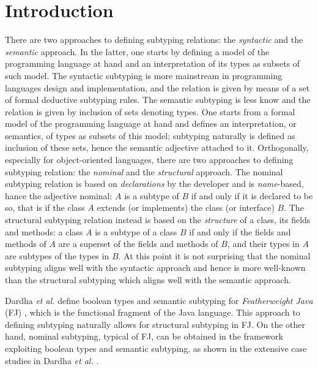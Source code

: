 \documentclass[runningheads]{llncs}
\begin{document}
\section{Introduction}
There are two approaches to defining subtyping relations: the \emph{syntactic} and the \emph{semantic} approach.
In the latter, one starts by defining a model of the programming language at hand and an interpretation of its types as subsets of such model.
The syntactic subtyping is more mainstream in programming languages design and implementation, and the relation is given by means of a set of formal deductive subtyping rules.
The semantic subtyping is less know and the relation is given by inclusion of sets denoting types. One starts from a formal model of the programming language at hand and defines an interpretation, or semantics, of types as subsets of this model; subtyping naturally is defined as inclusion of these sets, hence the semantic adjective attached to it.
Orthogonally, especially for object-oriented languages, there are two approaches to defining subtyping relation: the \emph{nominal} and the \emph{structural} approach.
The nominal subtyping relation is based on \emph{declarations} by the developer and is \emph{name}-based, hance the adjective nominal: $A$ is a subtype of $B$ if and only if it is declared to be so, that is if the class $A$ extends (or implements) the class (or interface) $B$.
The structural subtyping relation instead is based on the \emph{structure} of a class, its fields and methods: a class $A$ is a subtype of a class $B$ if and only if the fields and methods of $A$ are a superset of the fields and methods of $B$, and their types in $A$ are subtypes of the types in $B$.
At this point it is not surprising that the nominal subtyping aligns well with the syntactic approach and hence is more well-known than the structural subtyping which aligns well with the semantic approach.

Dardha \emph{et al.} \cite{Dardha2013,Dardha2017} define boolean types and semantic subtyping for \emph{Featherweight Java} (FJ) \cite{featherweight}, which is the functional fragment of the Java language.
This approach to defining subtyping naturally allows for structural subtyping in FJ.
On the other hand, nominal subtyping, typical of FJ, can be obtained in the framework exploiting boolean types and semantic subtyping, as shown in the extensive case studies in Dardha \emph{et al.} \cite[\S 8.4]{Dardha2017}.
\end{document}
